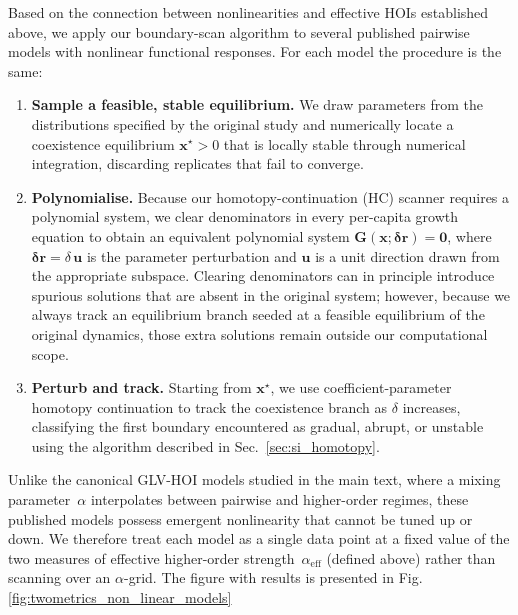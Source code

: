 \documentclass[pdflatex,sn-mathphys-num]{sn-jnl}%
\begin{document}
Based on the connection between nonlinearities and effective HOIs established above, we apply our boundary-scan algorithm to several published pairwise models with nonlinear functional responses. For each model the procedure is the same:
\begin{enumerate}
 \item \textbf{Sample a feasible, stable equilibrium.} We draw parameters from the distributions specified by the original study and numerically locate a coexistence equilibrium $\mathbf{x}^\star > 0$ that is locally stable through numerical integration, discarding replicates that fail to converge.
 \item \textbf{Polynomialise.} Because our homotopy-continuation (HC) scanner requires a polynomial system, we clear denominators in every per-capita growth equation to obtain an equivalent polynomial system $\mathbf{G}(\mathbf{x};\boldsymbol{\delta r}) = \mathbf{0}$, where $\boldsymbol{\delta r} = \delta\,\mathbf{u}$ is the parameter perturbation and $\mathbf{u}$ is a unit direction drawn from the appropriate subspace. Clearing denominators can in principle introduce spurious solutions that are absent in the original system; however, because we always track an equilibrium branch seeded at a feasible equilibrium of the original dynamics, those extra solutions remain outside our computational scope.
 \item \textbf{Perturb and track.} Starting from $\mathbf{x}^\star$, we use coefficient-parameter homotopy continuation to track the coexistence branch as $\delta$ increases, classifying the first boundary encountered as gradual, abrupt, or unstable using the algorithm described in Sec.~\ref{sec:si_homotopy}.
\end{enumerate}

Unlike the canonical GLV-HOI models studied in the main text, where a mixing parameter~$\alpha$ interpolates between pairwise and higher-order regimes, these published models possess emergent nonlinearity that cannot be tuned up or down. We therefore treat each model as a single data point at a fixed value of the two measures of effective higher-order strength~$\alpha_{\mathrm{eff}}$ (defined above) rather than scanning over an $\alpha$-grid. The figure with results is presented in Fig. \ref{fig:twometrics_non_linear_models}
\end{document}

